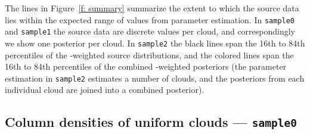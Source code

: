 \documentclass[fleqn,usenatbib]{mnras}
\begin{document}
The lines in Figure~\ref{f: summary} summarize the extent to which the source data lies within the expected range of values from parameter estimation.
In \texttt{sample0} and \texttt{sample1} the source data are discrete values per cloud,
and correspondingly we show one posterior per cloud.
In \texttt{sample2} the black lines span the 16th to 84th percentiles of the -weighted source distributions,
and the colored lines span the 16th to 84th percentiles of the combined -weighted posteriors (the parameter estimation in \texttt{sample2} estimates a number of clouds, and the posteriors from each individual cloud are joined into a combined posterior).

\subsection{Column densities of uniform clouds --- \texttt{sample0}}
\label{s: results -- sample0}
\end{document}
